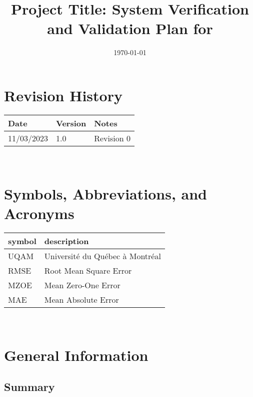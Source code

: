 \documentclass[12pt, titlepage]{article}
\begin{document}
\title{Project Title: System Verification and Validation Plan for \progname{}} 
\author{\authname}
\date{\today}
	
\maketitle


\section*{Revision History}

\begin{tabularx}{\textwidth}{p{3cm}p{2cm}X}
\toprule {\bf Date} & {\bf Version} & {\bf Notes}\\
\midrule
11/03/2023 & 1.0 & Revision 0\\
\bottomrule
\end{tabularx}

~\\

\newpage

\tableofcontents

\listoftables

\newpage

\section{Symbols, Abbreviations, and Acronyms}

\renewcommand{\arraystretch}{1.2}
\begin{tabular}{l l} 
  \toprule		
  \textbf{symbol} & \textbf{description}\\
  \midrule 
  UQAM & Université du Québec à Montréal\\
  RMSE & Root Mean Square Error\\
  MZOE & Mean Zero-One Error\\
  MAE & Mean Absolute Error\\
  \bottomrule
\end{tabular}\\

\newpage


\section{General Information}

\subsection{Summary}
\end{document}
